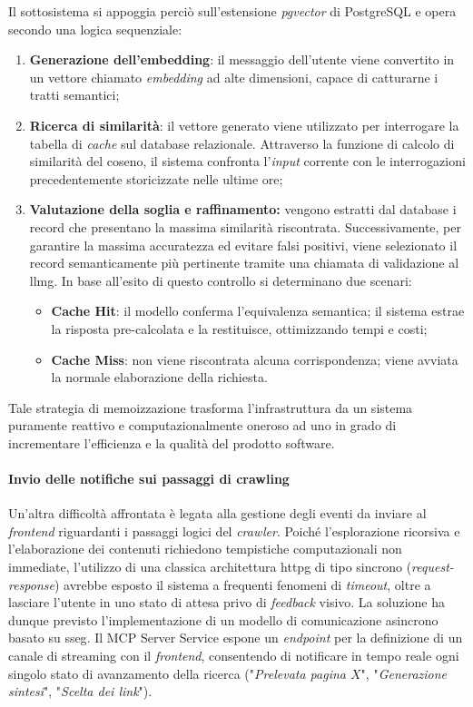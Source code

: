 Il sottosistema si appoggia perciò sull'estensione \textit{pgvector} di PostgreSQL e opera 
secondo una logica sequenziale:
\begin{enumerate}
    \item \textbf{Generazione dell'embedding}: il messaggio dell'utente viene convertito 
    in un vettore chiamato \textit{embedding} ad alte dimensioni, 
    capace di catturarne i tratti semantici;
    \item \textbf{Ricerca di similarità}: il vettore generato viene utilizzato per interrogare 
    la tabella di \textit{cache} sul database relazionale.
    Attraverso la funzione di calcolo di similarità del coseno, il sistema 
    confronta l'\textit{input} corrente con le interrogazioni precedentemente storicizzate 
    nelle ultime ore;
    \item \textbf{Valutazione della soglia e raffinamento:} vengono estratti dal database i 
    record che presentano la massima similarità riscontrata. 
    Successivamente, per garantire la massima accuratezza ed evitare falsi positivi, 
    viene selezionato il record semanticamente più pertinente tramite una chiamata di 
    validazione al \gls{llmg}. In base all'esito di questo controllo si determinano due scenari:
    \begin{itemize}
        \item \textbf{Cache Hit}: il modello conferma l'equivalenza semantica; 
        il sistema estrae la risposta pre-calcolata e la restituisce, 
        ottimizzando tempi e costi;
        \item \textbf{Cache Miss}: non viene riscontrata alcuna corrispondenza; 
        viene avviata la normale elaborazione della richiesta.
    \end{itemize}
\end{enumerate}
Tale strategia di memoizzazione trasforma l'infrastruttura da un sistema puramente reattivo 
e computazionalmente oneroso ad uno in grado di incrementare l'efficienza 
e la qualità del prodotto software.

\paragraph{Invio delle notifiche sui passaggi di crawling}
Un'altra difficoltà affrontata è legata alla gestione degli eventi 
da inviare al \textit{frontend} riguardanti i passaggi logici del \textit{crawler}. 
Poiché l'esplorazione ricorsiva e l'elaborazione dei contenuti richiedono tempistiche 
computazionali non immediate, l'utilizzo di una classica architettura \gls{httpg} 
di tipo sincrono (\textit{request-response}) avrebbe esposto il sistema a frequenti 
fenomeni di \textit{timeout}, oltre a lasciare l'utente in uno stato di attesa privo 
di \textit{feedback} visivo.
La soluzione ha dunque previsto l'implementazione di un modello di 
comunicazione asincrono basato su \gls{sseg}. 
Il MCP Server Service espone un \textit{endpoint} per la definizione di un 
canale di streaming con il \textit{frontend}, consentendo di notificare 
in tempo reale ogni singolo stato di avanzamento della ricerca 
("\textit{Prelevata pagina $X$}", "\textit{Generazione sintesi}", 
"\textit{Scelta dei link}").


